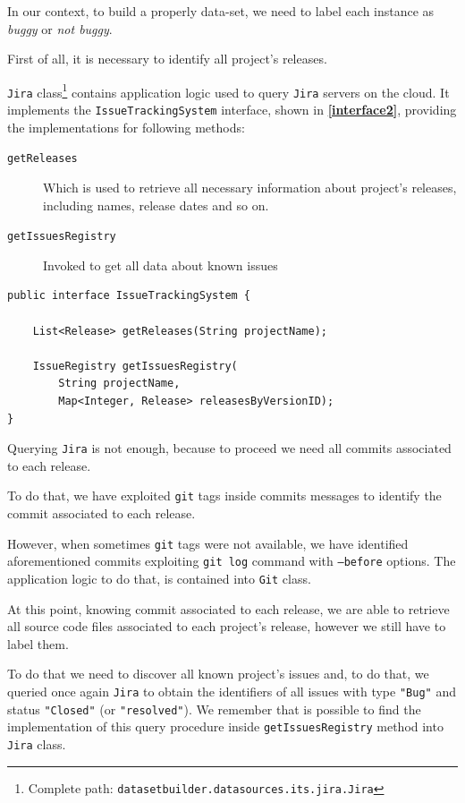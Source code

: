 \documentclass[sigconf]{acmart}
\begin{document}
In our context, to build a properly data-set, we need to label each instance as \textit{buggy} or \textit{not buggy}. 

First of all, it is necessary to identify all project's releases. 

\texttt{Jira} class\footnote{Complete path: \texttt{datasetbuilder.datasources.its.jira.Jira}} contains application logic used to query \texttt{Jira} servers on the cloud. It implements the \texttt{Issue\-Tracking\-System} interface, shown in \textbf{\cref{interface2}}, providing the implementations for following methods:

\begin{description}
\item[\texttt{getReleases}] Which is used to retrieve all necessary information about project's releases, including names, release dates and so on.
\item[\texttt{getIssuesRegistry}] Invoked to get all data about known issues 
\end{description}

\begin{lstlisting}[frame=lines,basicstyle=\ttfamily\scriptsize, caption={\texttt{IssueTrackingSystem} interface}, label={interface2}]
public interface IssueTrackingSystem {

    List<Release> getReleases(String projectName);

    IssueRegistry getIssuesRegistry(
    	String projectName, 
    	Map<Integer, Release> releasesByVersionID);
}
\end{lstlisting}

Querying \texttt{Jira} is not enough, because to proceed we need all commits associated to each release.

To do that, we have exploited \texttt{git} tags inside commits messages to identify the commit associated to each release. 

However, when sometimes \texttt{git} tags were not available, we have identified aforementioned commits exploiting \texttt{git\- log} command with \texttt{--before\- [date]} options. The application logic to do that, is contained into \texttt{Git} class.

At this point, knowing commit associated to each release, we are able to retrieve all source code files associated to each project's release, however we still have to label them.

To do that we need to discover all known project's issues and, to do that, we queried once again \texttt{Jira} to obtain the identifiers of all issues with type \texttt{"Bug"} and status \texttt{"Closed"} (or \texttt{"resolved"}). We remember that is possible to find the implementation of this query procedure inside \texttt{get\-Issues\-Registry} method into \texttt{Jira} class.
\end{document}
